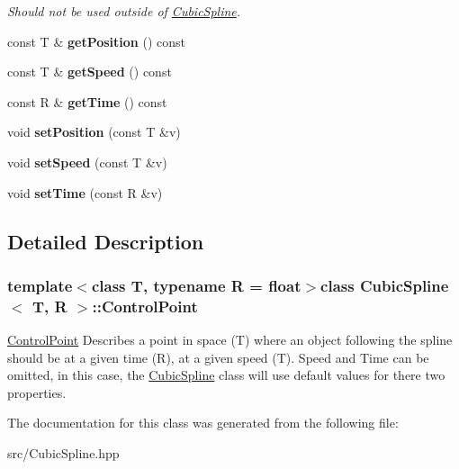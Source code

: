 \begin{DoxyCompactItemize}
\begin{DoxyCompactList}\small\item\em Should not be used outside of \hyperlink{class_cubic_spline}{Cubic\+Spline}. \end{DoxyCompactList}\item 
\hypertarget{class_cubic_spline_1_1_control_point_ad2b7492828bf99deccd63ec109ba5108}{const T \& {\bfseries get\+Position} () const }\label{class_cubic_spline_1_1_control_point_ad2b7492828bf99deccd63ec109ba5108}

\item 
\hypertarget{class_cubic_spline_1_1_control_point_ac044ae5f2b8433a929d796260f842a35}{const T \& {\bfseries get\+Speed} () const }\label{class_cubic_spline_1_1_control_point_ac044ae5f2b8433a929d796260f842a35}

\item 
\hypertarget{class_cubic_spline_1_1_control_point_aa69647374610bc460af1513594e8f4a0}{const R \& {\bfseries get\+Time} () const }\label{class_cubic_spline_1_1_control_point_aa69647374610bc460af1513594e8f4a0}

\item 
\hypertarget{class_cubic_spline_1_1_control_point_a91ead5475ce1d812f4840d53773820ec}{void {\bfseries set\+Position} (const T \&v)}\label{class_cubic_spline_1_1_control_point_a91ead5475ce1d812f4840d53773820ec}

\item 
\hypertarget{class_cubic_spline_1_1_control_point_a731e83e46d7c80febbf1f785e802bdb9}{void {\bfseries set\+Speed} (const T \&v)}\label{class_cubic_spline_1_1_control_point_a731e83e46d7c80febbf1f785e802bdb9}

\item 
\hypertarget{class_cubic_spline_1_1_control_point_a265dd8e9d9f16d8a4f4aacaa212f678e}{void {\bfseries set\+Time} (const R \&v)}\label{class_cubic_spline_1_1_control_point_a265dd8e9d9f16d8a4f4aacaa212f678e}

\end{DoxyCompactItemize}


\subsection{Detailed Description}
\subsubsection*{template$<$class T, typename R = float$>$class Cubic\+Spline$<$ T, R $>$\+::\+Control\+Point}

\hyperlink{class_cubic_spline_1_1_control_point}{Control\+Point} Describes a point in space (T) where an object following the spline should be at a given time (R), at a given speed (T). Speed and Time can be omitted, in this case, the \hyperlink{class_cubic_spline}{Cubic\+Spline} class will use default values for there two properties. 

The documentation for this class was generated from the following file\+:\begin{DoxyCompactItemize}
\item 
src/Cubic\+Spline.\+hpp\end{DoxyCompactItemize}
